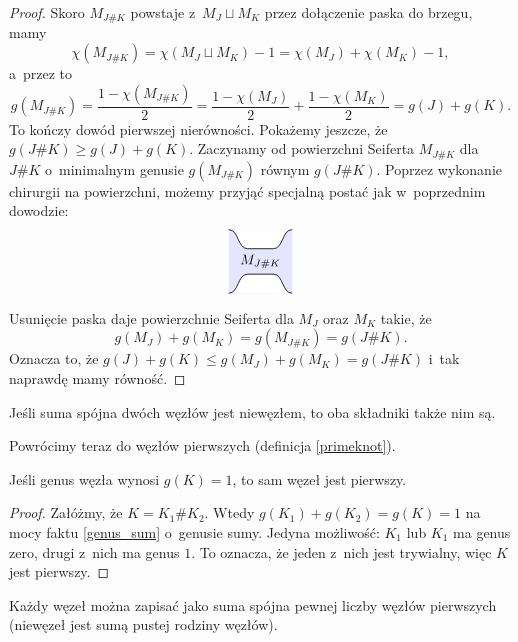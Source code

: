 \begin{proof}
    Skoro $M_{J\#K}$ powstaje z~$M_J \sqcup M_K$ przez dołączenie paska do brzegu, mamy
    \[
        \chi(M_{J\#K}) = \chi(M_J \sqcup M_K) - 1 = \chi(M_J) + \chi(M_K)-1,
    \]
    a~przez to
    \[
        g(M_{J\#K}) = \frac{1-\chi(M_{J\#K})}{2} =
        \frac{1-\chi(M_{J})}{2} + \frac{1-\chi(M_{K})}{2}
        = g(J) + g(K).
    \]
    To kończy dowód pierwszej nierówności.
    Pokażemy jeszcze, że $g(J \# K) \ge g(J)+g(K)$.
    Zaczynamy od powierzchni Seiferta $M_{J\#K}$ dla $J\#K$ o~minimalnym genusie $g(M_{J\#K})$ równym $g(J\#K)$.
    Poprzez wykonanie chirurgii na powierzchni, możemy przyjąć specjalną postać jak w~poprzednim dowodzie:
    \[
        \begin{tikzpicture}[baseline=-0.65ex,scale=0.16]
            \fill[blue!10!white] (-5, -5) rectangle(5, 5);
        \draw[semithick,fill=white] (-5, -5) to [out=right, in=left] (-2, -2) -- (2, -2) to [out=right, in=left] (5, -5);
        \draw[semithick,fill=white] (-5,  5) to [out=right, in=left] (-2,  2) -- (2,  2) to [out=right, in=left] (5,  5);
            \node at (0, 0) {$M_{J \# K}$};
        \end{tikzpicture}
    \]

    Usunięcie paska daje powierzchnie Seiferta dla $M_J$ oraz $M_K$ takie, że
    \[
        g(M_J)+g(M_K)=g(M_{J\#K})=g(J\#K).
    \]
    Oznacza to, że $g(J)+g(K)\leqslant g(M_J)+g(M_K)=g(J\#K)$ i~tak naprawdę mamy równość.
\end{proof}

\begin{corollary}
\label{no_inverses}
    Jeśli suma spójna dwóch węzłów jest niewęzłem, to oba składniki także nim są.
\end{corollary}

Powrócimy teraz do węzłów pierwszych (definicja \ref{primeknot}).

\begin{proposition}
    Jeśli genus węzła wynosi $g(K) = 1$, to sam węzeł jest pierwszy.
\end{proposition}

\begin{proof}
    Załóżmy, że $K=K_1\#K_2$.
    Wtedy $g(K_1)+g(K_2)=g(K)=1$ na mocy faktu  \ref{genus_sum} o~genusie sumy.
    Jedyna możliwość: $K_1$ lub $K_1$ ma genus zero, drugi z~nich ma genus $1$. To oznacza, że jeden z~nich jest trywialny, więc $K$ jest pierwszy.
\end{proof}

\begin{proposition}
    Każdy węzeł można zapisać jako suma spójna pewnej liczby węzłów pierwszych (niewęzeł jest sumą pustej rodziny węzłów).
\end{proposition}

